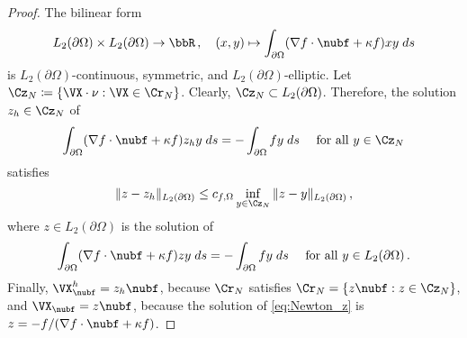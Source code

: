 \documentclass{siamart1116}
\numberwithin{theorem}{section}
\begin{document}
\begin{proof}
The bilinear form
\begin{equation}
L_2(\partial\Omega)\times L_2(\partial\Omega) \to \bbR\,,
\quad
(x,y)\mapsto \int_{\partial \Omega}  ( \nabla f\cdot \nubf + \kappa f) xy\; ds
\end{equation}
is $L_2(\partial\Omega)$-continuous,
symmetric, and $L_2(\partial\Omega)$-elliptic.
Let $\Cz_N\coloneqq\{\VX\cdot\nu: \VX \in \Cr_N\}$.
Clearly, $\Cz_N\subset L_2(\partial\Omega)$.
Therefore, the solution $z_h\in\Cz_N$ of
\begin{equation}
\int_{\partial \Omega}  ( \nabla f\cdot \nubf + \kappa f) z_h y\; ds
=  - \int_{\partial \Omega} f y \; ds \quad \text{ for all } y \in\Cz_N \end{equation}
satisfies
\begin{equation}
\Vert z - z_h\Vert_{L_2(\partial\Omega)} \leq c_{f,\Omega}
\inf_{y\in \Cz_N}
\Vert z - y \Vert_{L_2(\partial\Omega)}\,,
\end{equation}
where $z\in L_2(\partial\Omega)$ is the solution of
\begin{equation}\label{eq:Newton_z}
\int_{\partial \Omega}  ( \nabla f\cdot \nubf + \kappa f) z y\; ds
=  - \int_{\partial \Omega} f y \; ds \quad \text{ for all } y \in L_2(\partial\Omega)\,.
\end{equation}
Finally, $\VX_{\nubf}^h = z_h\nubf$, because $\Cr_N$ satisfies
$\Cr_N = \{z\nubf: z \in \Cz_N\}$,
and $\VX_{\nubf}= z\nubf$, because the
solution of \cref{eq:Newton_z} is
$z=-f/(\nabla f\cdot \nubf+ \kappa f)$.
\end{proof}
\end{document}
